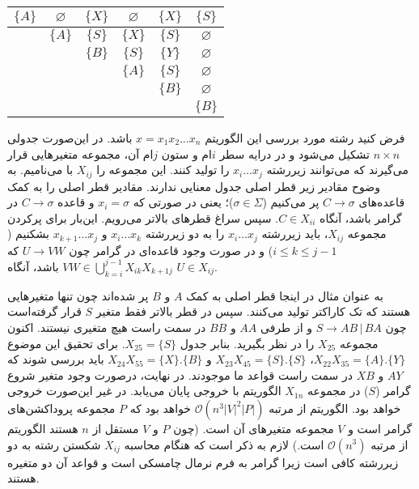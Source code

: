 \documentclass[main.tex]{subfiles}
\begin{document}
\begin{example}
\setLTR
			\begin{center}
			\begin{tabular}{|c|c|c|c|c|c|}
				\hline
				$\{A\}$ & $\varnothing$ & $\{X\}$ & $\varnothing$ & $\{X\}$ & $\{S\}$ \\
				\hline
				 & $\{A\}$ & $\{S\}$ & $\{X\}$ & $\{S\}$ & $\varnothing$ \\
				\hline
				 &  & $\{B\}$ & $\{S\}$ & $\{Y\}$ & $\varnothing$ \\
				\hline
				 & & & $\{A\}$ & $\{S\}$ & $\varnothing$ \\
				\hline
				 &  &  &  & $\{B\}$ & $\varnothing$ \\
				\hline
				 &  & &  &  & $\{B\}$ \\
				\hline
			\end{tabular}
		\end{center}
\setRTL
فرض کنید رشته مورد بررسی این الگوریتم 
	$x = x_1x_2\dots x_n$
	باشد. در این‌صورت جدولی $n \times n$ تشکیل می‌شود و در درایه سطر $i$ام و ستون $j$ام آن، مجموعه متغیرهایی قرار می‌گیرند که می‌توانند زیررشته 
	$x_i\dots x_j$
	را تولید کنند. این مجموعه را 
	$X_{ij}$
	با می‌نامیم. به وضوح مقادیر زیر قطر اصلی جدول معنایی ندارند. مقادیر قطر اصلی را به کمک قاعده‌های 
	$C \rightarrow \sigma$
	 پر می‌کنیم
	 ($\sigma \in \Sigma$)؛
یعنی در صورتی که 
	$x_i = \sigma$
	و قاعده 
	$C \rightarrow \sigma$
	در گرامر باشد، آنگاه  
	$C \in X_{ii}$.
	 سپس سراغ قطرهای بالاتر می‌رویم. این‌بار برای پرکردن مجموعه 
	$X_{ij}$،
	 باید زیررشته 
	$x_i\dots x_j$
	را به دو زیررشته 
	$x_i\dots x_k$
	و
	$x_{k+1}\dots x_j$
	بشکنیم 
	($i \leq k \leq j - 1$)
	و در صورت وجود قاعده‌ای در گرامر چون
	$U \rightarrow VW$
	که 
	$VW \in \bigcup\limits_{k = i}^{j - 1} X_{ik}X_{k+1j}$
	باشد، آنگاه 
	$U \in X_{ij}$. 
	
	به عنوان مثال در اینجا قطر اصلی به کمک 
	$A$
	و
	$B$ 
	پر شده‌اند چون تنها متغیرهایی هستند که تک کاراکتر تولید می‌کنند. سپس در قطر بالاتر فقط متغیر $S$ قرار گرفته‌است چون 
	$S \rightarrow AB \, | \, BA$ 
	و از طرفی
	$AA$ 
	و
	$BB$
	در سمت راست هیچ متغیری نیستند. اکنون مجموعه
	$X_{25}$
	را در نظر بگیرید. بنابر جدول
	$X_{25} = \{S\}$.
	برای تحقیق این موضوع 
	$X_{22}X_{35} = \{A\}.\{Y\}$،
	$X_{23}X_{45} = \{S\}.\{S\}$
	و
	$X_{24}X_{55} = \{X\}.\{B\}$
	باید بررسی شوند که $AY$ و $XB$ در سمت راست قواعد ما موجودند. در نهایت، درصورت وجود متغیر شروع گرامر ($S$) در مجموعه 
	$X_{1n}$
	الگوریتم با خروجی 
	پایان می‌یابد. در غیر این‌صورت خروجی
	  خواهد بود. الگوریتم از مرتبه
	 $ \mathcal{O}(n^3|V|^2|P|)$
	 خواهد بود که $P$ مجموعه پروداکشن‌های گرامر است و $V$ مجموعه متغیر‌های آن است. (چون $P$ و $V$ مستقل از $n$ هستند الگوریتم از مرتبه  $\mathcal{O}(n^3)$ است.) لازم به ذکر است که هنگام محاسبه 
	 $X_{ij}$
	 شکستن رشته به دو زیررشته کافی است زیرا گرامر به فرم نرمال چامسکی است و قواعد آن دو متغیره هستند.


\end{example}
\end{document}
